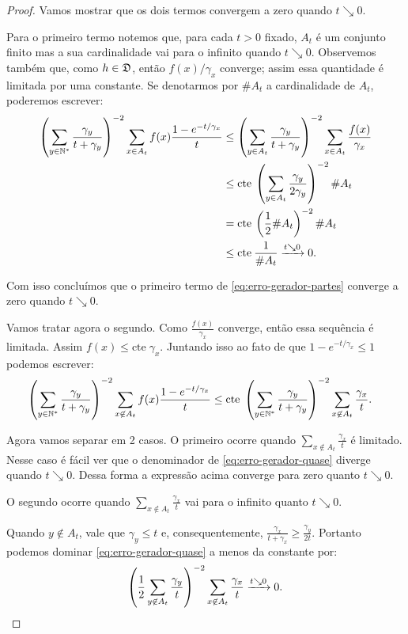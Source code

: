 \begin{proof}
  Vamos mostrar que os dois termos convergem a zero quando $t
  \searrow 0$.

  Para o primeiro termo notemos que, para cada $t > 0$ fixado, $A_t$ é
  um conjunto finito mas a sua cardinalidade vai para o infinito
  quando $t \searrow 0$. Observemos também que, como $h \in {\mathfrak{D}}$,
  então $f(x)/\gamma_x$ converge; assim essa quantidade é limitada por
  uma constante. Se denotarmos por $\#A_t$ a cardinalidade de $A_t$,
  poderemos escrever:
  \begin{align*}
    \left( \sum_{y \in {\mathbb{N^*}}} \frac{\gamma_y}{t + \gamma_y} \right)^{-2}
    \sum_{x \in A_t} f(x) \frac{1 - e^{-t/\gamma_x}}{t}
    &\leq
    \left( \sum_{y \in A_t} \frac{\gamma_y}{t + \gamma_y} \right)^{-2}
    \sum_{x \in A_t} \frac{f(x)}{\gamma_x}\\
    &\leq \mathrm{cte} \:
    \left( \sum_{y \in A_t} \frac{\gamma_y}{2 \gamma_y} \right)^{-2}
    \# A_t\\
    &= \mathrm{cte} \:
    \left( \frac{1}{2} \# A_t \right)^{-2}
    \# A_t\\
    &\leq \mathrm{cte} \: \frac{1}{\#A_t}
    \xrightarrow{t \searrow 0} 0.
  \end{align*}

  Com isso concluímos que o primeiro termo de
  \eqref{eq:erro-gerador-partes} converge a zero quando $t \searrow
  0$.

  Vamos tratar agora o segundo. Como $\frac{f(x)}{\gamma_x}$ converge,
  então essa sequência é limitada. Assim $f(x) \leq \mathrm{cte}\;
  \gamma_x$. Juntando isso ao fato de que $1 - e^{-t/\gamma_x} \leq 1$
  podemos escrever:
  \begin{align}
    \label{eq:erro-gerador-quase}
    \left( \sum_{y \in {\mathbb{N^*}}} \frac{\gamma_y}{t + \gamma_y} \right)^{-2}
    \sum_{x \not\in A_t} f(x) \frac{1 - e^{-t/\gamma_x}}{t}
    & \leq \mathrm{cte} \;
    \left( \sum_{y \in {\mathbb{N^*}}} \frac{\gamma_y}{t + \gamma_y} \right)^{-2}
    \sum_{x \not\in A_t} \frac{\gamma_x}{t}.
  \end{align}

  Agora vamos separar em 2 casos.  O primeiro ocorre quando $\sum_{x
    \not\in A_t} \frac{\gamma_x}{t}$ é limitado. Nesse caso é fácil
  ver que o denominador de \eqref{eq:erro-gerador-quase} diverge
  quando $t\searrow 0$. Dessa forma a expressão acima converge para zero
  quanto $t \searrow 0$.


  O segundo ocorre quando $\sum_{x \not\in A_t} \frac{\gamma_x}{t}$
  vai para o infinito quanto $t \searrow 0$.

  Quando $y \not\in A_t$, vale que $\gamma_y \leq t$ e,
  consequentemente, $\frac{\gamma_x}{t+\gamma_x} \geq \frac{\gamma_y}{2
    t}$. Portanto podemos dominar \eqref{eq:erro-gerador-quase} a
  menos da constante por:
  \begin{displaymath}
    \left(
      \frac{1}{2} \sum_{y \not\in A_t} \frac{\gamma_y}{t}
    \right)^{-2}
    \sum_{x \not\in A_t} \frac{\gamma_x}{t} \xrightarrow{t \searrow 0}
    0.\qedhere
  \end{displaymath}
\end{proof}

